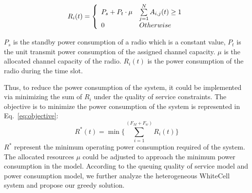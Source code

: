 \begin{equation}
\label{eq:radio}
 R_i(t) = \left\{ 
	  \begin{array}{l l}
	    P_s+P_t\cdot\mu   &  \sum\limits_{j=1}^N A_{i,j}(t) \ge 1\\
		0 &  Otherwise
			    \end{array} \right.
\end{equation}

$P_s$ is the standby power consumption of a radio which is a constant value, $P_t$ is the 
unit transmit power consumption of the assigned channel capacity. 
$\mu$ is the allocated channel capacity of the radio.
$R_i(t)$ is the power consumption of the radio during the time slot.

Thus, to reduce the power consumption of the system, it could be 
implemented via minimizing the sum of $R_i$ under the quality of service constraints. 
The objective is to minimize the power consumption of the system is represented in Eq.~\ref{eq:objective}:
\begin{equation}
\label{eq:objective}
R^*(t) = \min{\{\sum\limits_{i=1}^{(F_M+F_w)} R_{i}}(t)\}
\end{equation}
$R^*$ represent the minimum operating power consumption required of the system. 
The allocated resources $\mu$ could be adjusted to approach the minimum power consumption 
in the model. 
According to the queuing quality of service model and power consumption model, 
we further analyze the heterogeneous WhiteCell system and propose our greedy solution.

